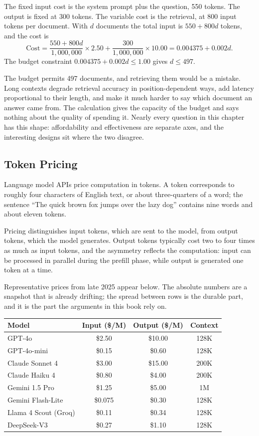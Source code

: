\documentclass[11pt]{book}
\begin{document}
The fixed input cost is the system prompt plus the question, 550 tokens. The output is fixed at 300 tokens. The variable cost is the retrieval, at 800 input tokens per document. With $d$ documents the total input is $550 + 800d$ tokens, and the cost is
\[
\text{Cost} = \frac{550 + 800d}{1{,}000{,}000} \times 2.50 + \frac{300}{1{,}000{,}000} \times 10.00 = 0.004375 + 0.002d.
\]
The budget constraint $0.004375 + 0.002d \leq 1.00$ gives $d \leq 497$.

The budget permits 497 documents, and retrieving them would be a mistake. Long contexts degrade retrieval accuracy in position-dependent ways, add latency proportional to their length, and make it much harder to say which document an answer came from. The calculation gives the capacity of the budget and says nothing about the quality of spending it. Nearly every question in this chapter has this shape: affordability and effectiveness are separate axes, and the interesting designs sit where the two disagree.

\subsection{Token Pricing}

Language model APIs price computation in tokens. A token corresponds to roughly four characters of English text, or about three-quarters of a word; the sentence ``The quick brown fox jumps over the lazy dog'' contains nine words and about eleven tokens.

Pricing distinguishes input tokens, which are sent to the model, from output tokens, which the model generates. Output tokens typically cost two to four times as much as input tokens, and the asymmetry reflects the computation: input can be processed in parallel during the prefill phase, while output is generated one token at a time.

Representative prices from late 2025 appear below. The absolute numbers are a snapshot that is already drifting; the spread between rows is the durable part, and it is the part the arguments in this book rely on.

\begin{center}
\begin{tabular}{lccc}
\toprule
Model & Input (\$/M) & Output (\$/M) & Context \\
\midrule
GPT-4o & \$2.50 & \$10.00 & 128K \\
GPT-4o-mini & \$0.15 & \$0.60 & 128K \\
Claude Sonnet 4 & \$3.00 & \$15.00 & 200K \\
Claude Haiku 4 & \$0.80 & \$4.00 & 200K \\
Gemini 1.5 Pro & \$1.25 & \$5.00 & 1M \\
Gemini Flash-Lite & \$0.075 & \$0.30 & 128K \\
Llama 4 Scout (Groq) & \$0.11 & \$0.34 & 128K \\
DeepSeek-V3 & \$0.27 & \$1.10 & 128K \\
\bottomrule
\end{tabular}
\end{center}
\end{document}
